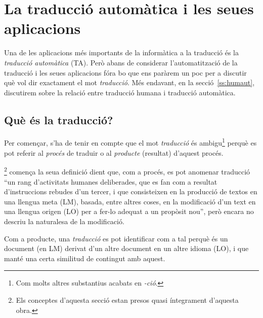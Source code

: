 \chapter[Traducció automàtica i aplicacions]{La traducció automàtica i les seues aplicacions}
\label{se:UTA} \label{se:TiTA} %

Una de les aplicacions més importants de la informàtica a la traducció
és la \emph{traducció automàtica} (TA). Però abans de considerar
l'automatització de la traducció i les seues aplicacions fóra bo que
ens paràrem un poc per a discutir què vol dir exactament el mot
\emph{traducció}. Més endavant, en la secció~\ref{ss:humaut},
discutirem sobre la relació entre traducció humana i traducció
automàtica.

\section{Què és la traducció?}
\label{ss:trad}

Per començar, s'ha de tenir en compte que el mot \emph{traducció} és
ambigu\footnote{Com molts altres substantius acabats en \emph{-ció}.}
perquè es pot referir al \emph{procés} de traduir o al \emph{producte}
(resultat) d'aquest procés.

\citet{sager93b}\footnote{Els conceptes d'aquesta secció estan presos
  quasi íntegrament d'aquesta obra.} comença la seua definició dient
que, com a procés, es pot anomenar traducció ``un rang d'activitats
humanes deliberades, que es fan com a resultat d'instruccions rebudes
d'un tercer, i que consisteixen en la producció de textos en una
llengua meta (LM), basada, entre altres coses, en la modificació d'un
text en una llengua origen (LO) per a fer-lo adequat a un propòsit
nou'', però encara no descriu la naturalesa de la modificació.

Com a producte, una \emph{traducció} es pot identificar com a tal
perquè és un document (en LM) derivat d'un altre document en un altre
idioma (LO), i que manté una certa similitud de contingut amb aquest.

